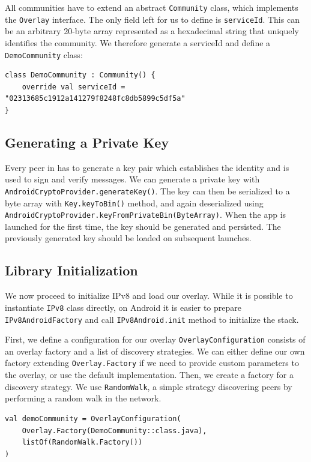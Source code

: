All communities have to extend an abstract \texttt{Community} class, which implements the \texttt{Overlay} interface. The only field left for us to define is \texttt{serviceId}. This can be an arbitrary 20-byte array represented as a hexadecimal string that uniquely identifies the community. We therefore generate a serviceId and define a \texttt{DemoCommunity} class:

\begin{verbatim}
class DemoCommunity : Community() {
    override val serviceId = "02313685c1912a141279f8248fc8db5899c5df5a"
}
\end{verbatim}


\subsection{Generating a Private Key}

Every peer in has to generate a key pair which establishes the identity and is used to sign and verify messages. We can generate a private key with \texttt{AndroidCryptoProvider.generateKey()}. The key can then be serialized to a byte array with \texttt{Key.keyToBin()} method, and again deserialized using \texttt{AndroidCryptoProvider.keyFromPrivateBin(ByteArray)}. When the app is launched for the first time, the key should be generated and persisted. The previously generated key should be loaded on subsequent launches.

\subsection{Library Initialization}

We now proceed to initialize IPv8 and load our overlay. While it is possible to instantiate \texttt{IPv8} class directly, on Android it is easier to prepare \texttt{IPv8AndroidFactory} and call \texttt{IPv8Android.init} method to initialize the stack.

First, we define a configuration for our overlay \texttt{OverlayConfiguration} consists of an overlay factory and a list of discovery strategies. We can either define our own factory extending \texttt{Overlay.Factory} if we need to provide custom parameters to the overlay, or use the default implementation. Then, we create a factory for a discovery strategy. We use \texttt{RandomWalk}, a simple strategy discovering peers by performing a random walk in the network.

\begin{verbatim}
val demoCommunity = OverlayConfiguration(
    Overlay.Factory(DemoCommunity::class.java),
    listOf(RandomWalk.Factory())
)
\end{verbatim}

